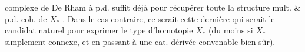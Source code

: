complexe de De Rham à p.d.  suffit déjà pour récupérer toute la structure mult. \& p.d. coh. de $X_*$ . Dans le cas contraire, ce serait cette dernière qui serait le candidat  naturel pour exprimer le type d'homotopie $X_*$ (du moins si $X_*$  simplement connexe, et en passant à une cat. dérivée convenable bien sûr).

